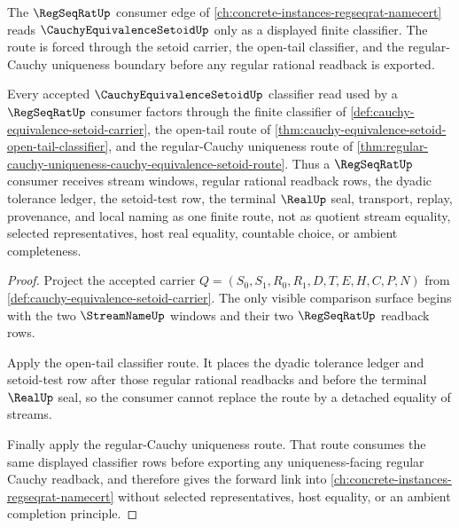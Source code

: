 The $\RegSeqRatUp$ consumer edge of \autoref{ch:concrete-instances-regseqrat-namecert} reads $\CauchyEquivalenceSetoidUp$ only as a displayed finite classifier. The route is forced through the setoid carrier, the open-tail classifier, and the regular-Cauchy uniqueness boundary before any regular rational readback is exported.

\begin{theorem}
\label{thm:cauchy-equivalence-setoid-regseqrat-forward-link}
Every accepted $\CauchyEquivalenceSetoidUp$ classifier read used by a $\RegSeqRatUp$ consumer factors through the finite classifier of \autoref{def:cauchy-equivalence-setoid-carrier}, the open-tail route of \autoref{thm:cauchy-equivalence-setoid-open-tail-classifier}, and the regular-Cauchy uniqueness route of \autoref{thm:regular-cauchy-uniqueness-cauchy-equivalence-setoid-route}. Thus a $\RegSeqRatUp$ consumer receives stream windows, regular rational readback rows, the dyadic tolerance ledger, the setoid-test row, the terminal $\RealUp$ seal, transport, replay, provenance, and local naming as one finite route, not as quotient stream equality, selected representatives, host real equality, countable choice, or ambient completeness.
\end{theorem}
\begin{proof}
Project the accepted carrier $Q=(S_0,S_1,R_0,R_1,D,T,E,H,C,P,N)$ from \autoref{def:cauchy-equivalence-setoid-carrier}. The only visible comparison surface begins with the two $\StreamNameUp$ windows and their two $\RegSeqRatUp$ readback rows.

Apply the open-tail classifier route. It places the dyadic tolerance ledger and setoid-test row after those regular rational readbacks and before the terminal $\RealUp$ seal, so the consumer cannot replace the route by a detached equality of streams.

Finally apply the regular-Cauchy uniqueness route. That route consumes the same displayed classifier rows before exporting any uniqueness-facing regular Cauchy readback, and therefore gives the forward link into \autoref{ch:concrete-instances-regseqrat-namecert} without selected representatives, host equality, or an ambient completion principle.
\end{proof}


